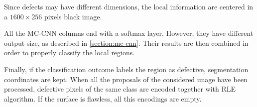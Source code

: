     \par{
        Since defects may have different dimensions, the local information are centered in a $1600\times 256$ pixels black image.
    }
    \par{
        All the MC-CNN columns end with a softmax layer. However, they have different output size, as described in \ref{section:mc-cnn}. Their results are then combined in order to properly classify the local regions.
    }
    \par{
        Finally, if the classification outcome labels the region as defective, segmentation coordinates are kept. When all the proposals of the considered image have been processed, defective pixels of the same class are encoded together with RLE algorithm. If the surface is flawless, all this encodings are empty.
    }